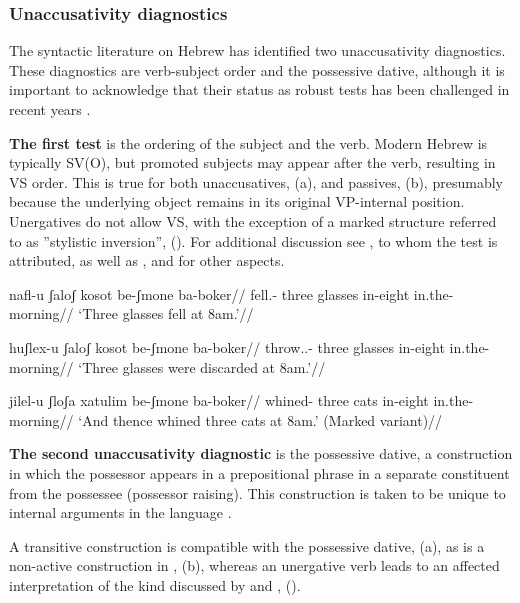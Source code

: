 {	\subsubsection{Unaccusativity diagnostics} \label{vz:tnif:nact:unacc}
The syntactic literature on Hebrew has identified two unaccusativity diagnostics. These diagnostics are verb-subject order and the possessive dative, although it is important to acknowledge that their status as robust tests has been challenged in recent years \citep{gafter14li,linzen14pd,kastner17gjgl}.

\textbf{The first test} is the ordering of the subject and the verb. Modern Hebrew is typically SV(O), but promoted subjects may appear after the verb, resulting in VS order. This is true for both unaccusatives, (\nextx a), and passives, (\nextx b), presumably because the underlying object remains in its original VP-internal position. Unergatives do not allow VS, with the exception of a marked structure referred to as ''stylistic inversion'', (\anextx). For additional discussion see \cite{shlonsky87}, to whom the test is attributed, as well as \cite{shlonskydoron91}, \cite{borer95} and \cite{preminger10} for other aspects.

\pex
	\a  \begingl
	\gla{}nafl-u ʃaloʃ kosot be-ʃmone ba-boker//
	\glb fell.- three glasses in-eight in.the-morning//
	\glft `Three glasses fell at 8am.'//
	\endgl

	\a \begingl
	\gla{}huʃlex-u ʃaloʃ kosot be-ʃmone ba-boker//
	\glb throw..- three glasses in-eight in.the-morning//
	\glft `Three glasses were discarded at 8am.'//
	\endgl
\xe

\ex \begingl
	\gla{}\ljudge{\#}jilel-u ʃloʃa xatulim be-ʃmone ba-boker//
	\glb whined- three cats in-eight in.the-morning//
	\glft `And thence whined three cats at 8am.' (Marked variant)//
	\endgl
\xe
   
\textbf{The second unaccusativity diagnostic} is the possessive dative, a construction in which the possessor appears in a prepositional phrase in a separate constituent from the possessee (possessor raising). This construction is taken to be unique to internal arguments in the language \citep{borergrodzinsky86}.

A transitive construction is compatible with the possessive dative, (\nextx a), as is a non-active construction in {\tnif}, (\nextx b), whereas an unergative verb leads to an affected interpretation of the kind discussed by \cite{arieletal15} and \cite{barashersiegalboneh16}, (\anextx). 

}
